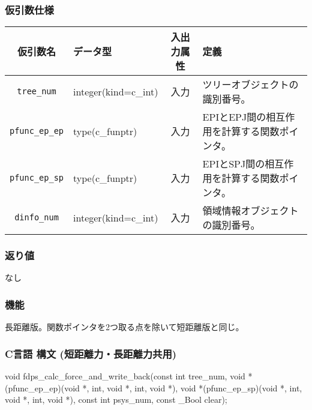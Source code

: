 \subsubsection*{仮引数仕様}
\begin{table}[h]
\begin{tabularx}{\linewidth}{cXcX}
\toprule
\rowcolor{Snow2}
仮引数名 & データ型 & 入出力属性 & 定義 \\
\midrule
\verb|tree_num|    & integer(kind=c\_int)   & 入力     & ツリーオブジェクトの識別番号。\\
\verb|pfunc_ep_ep| & type(c\_funptr)        & 入力     & EPIとEPJ間の相互作用を計算する関数ポインタ。\\
\verb|pfunc_ep_sp| & type(c\_funptr)        & 入力     & EPIとSPJ間の相互作用を計算する関数ポインタ。\\
\verb|dinfo_num|   & integer(kind=c\_int)   & 入力     & 領域情報オブジェクトの識別番号。\\
\bottomrule
\end{tabularx}
\end{table}

\subsubsection*{返り値}
なし

\subsubsection*{機能}
長距離版。関数ポインタを2つ取る点を除いて短距離版と同じ。
\clearpage

\subsubsection*{C言語 構文 (短距離力・長距離力共用)}
\begin{screen}
\begin{spverbatim}
void fdps_calc_force_and_write_back(const int tree_num,                                             
                                    void *(pfunc_ep_ep)(void *, int, void *, int, void *),          
                                    void *(pfunc_ep_sp)(void *, int, void *, int, void *),          
                                    const int psys_num,                                             
                                    const _Bool clear);
\end{spverbatim}
\end{screen}

